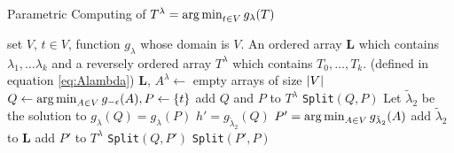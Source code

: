 \begin{algorithm}
	\caption{Parametric Computing of $T^{\lambda} = \operatorname*{arg\,min}_{t\in V} g_{\lambda}(T)$}\label{alg:pmfT}
	\begin{algorithmic}[1]
		\REQUIRE set $V$, $t \in V$, function $g_{\lambda}$ whose domain is $V$.
		\ENSURE An ordered array \textbf{L} which contains $\lambda_1, \dots \lambda_k$ and a reversely ordered array $T^{\lambda}$ which contains $T_0,\dots, T_k$. (defined in equation \eqref{eq:Alambda})
		\STATE \textbf{L}, $A^{\lambda} \leftarrow$ empty arrays of size $\lvert V\rvert$
		\STATE $Q \leftarrow \operatorname*{arg\,min}_{A\in V} g_{-\epsilon}(A), P \leftarrow \{ t \}$ \label{alg:uini}
		\STATE add $Q$ and $P$ to $T^{\lambda}$
		\STATE \texttt{Split}$(Q,P)$
		\STATE Let $\tilde{\lambda}_2$ be the solution to $g_{\lambda}(Q) =  g_{\lambda}(P)$
		\STATE $h' = g_{\tilde{\lambda}_2}(Q)$
		\STATE $P' =\operatorname*{arg\,min}_{A\in V} g_{\tilde{\lambda}_2}(A)$  \label{alg:Pap}
		\STATE add  $\tilde{\lambda}_2$ to $\mathbf{L}$
		\ELSE
		\STATE add $P'$ to $T^{\lambda}$ \label{alg:addP}
		\STATE \texttt{Split}$(Q,P')$
		\STATE \texttt{Split}$(P',P)$
		\ENDIF
		\ENDFUNCTION
	\end{algorithmic}
\end{algorithm}